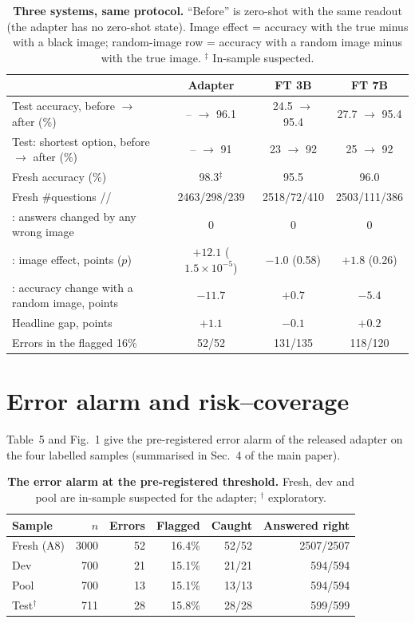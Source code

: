\begin{table}[h]
  \centering
  \small
  \setlength{\tabcolsep}{8pt}
  \begin{tabular}{@{}lccc@{}}
    \toprule
     & Adapter & FT 3B & FT 7B \\
    \midrule
    Test accuracy, before $\to$ after (\%) & -- $\to$ 96.1 & 24.5 $\to$ 95.4 & 27.7 $\to$ 95.4 \\
    Test: shortest option, before $\to$ after (\%) & -- $\to$ 91 & 23 $\to$ 92 & 25 $\to$ 92 \\
    Fresh accuracy (\%) & 98.3$^\ddagger$ & 95.5 & 96.0 \\
    Fresh \#questions \HI{}/\MID{}/\LO{} & 2463/298/239 & 2518/72/410 & 2503/111/386 \\
    \HI{}: answers changed by any wrong image & 0 & 0 & 0 \\
    \LO{}: image effect, points ($p$) & $+12.1$ ($1.5\!\times\!10^{-5}$) & $-1.0$ (0.58) & $+1.8$ (0.26) \\
    \LO{}: accuracy change with a random image, points & $-11.7$ & $+0.7$ & $-5.4$ \\
    Headline gap, points & $+1.1$ & $-0.1$ & $+0.2$ \\
    Errors in the flagged 16\% & 52/52 & 131/135 & 118/120 \\
    \bottomrule
  \end{tabular}
  \caption{\textbf{Three systems, same protocol.} ``Before'' is zero-shot with the same readout (the adapter has no zero-shot state). Image effect = accuracy with the true minus with a black image; random-image row = accuracy with a random image minus with the true image. $^\ddagger$ In-sample suspected.}
  \label{tab:train}
\end{table}

\section{Error alarm and risk--coverage}
\label{app:alarm}

Table~5 and Fig.~1 give the pre-registered error alarm of the released adapter on the four labelled samples (summarised in Sec.~4 of the main paper).

\begin{table}[h]
  \centering
  \small
  \setlength{\tabcolsep}{3.0pt}
  \begin{tabular}{@{}lrrrrr@{}}
    \toprule
    Sample & $n$ & Errors & Flagged & Caught & Answered right \\
    \midrule
    Fresh (A8)   & 3000 & 52 & 16.4\% & 52/52 & 2507/2507 \\
    Dev          &  700 & 21 & 15.1\% & 21/21 &  594/594 \\
    Pool         &  700 & 13 & 15.1\% & 13/13 &  594/594 \\
    Test$^\dagger$ &  711 & 28 & 15.8\% & 28/28 &  599/599 \\
    \bottomrule
  \end{tabular}
  \caption{\textbf{The error alarm at the pre-registered threshold.} Fresh, dev and pool are in-sample suspected for the adapter; $^\dagger$ exploratory.}
  \label{tab:alarm}
\end{table}

